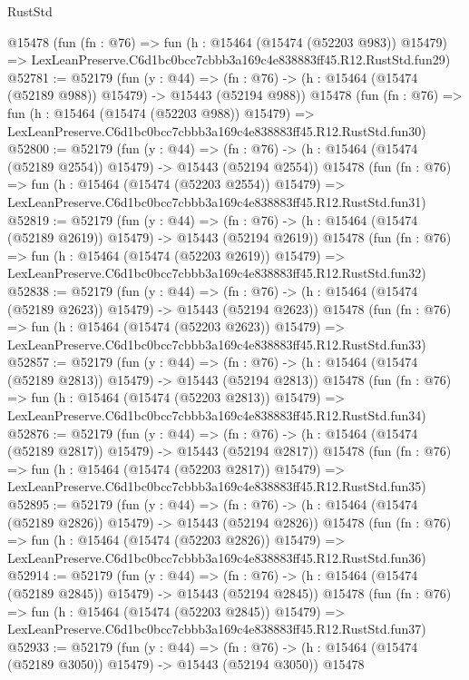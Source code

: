 \begin{lexlean}{RustStd}
\begin{coremodule}
    @15478
    (fun (fn : @76) =>
    fun (h : @15464 (@15474 (@52203 @983)) @15479) =>
    LexLeanPreserve.C6d1bc0bcc7cbbb3a169c4e838883ff45.R12.RustStd.fun29)
@52781 := @52179
    (fun (y : @44) =>
    (fn : @76) -> (h : @15464 (@15474 (@52189 @988)) @15479) -> @15443 (@52194 @988))
    @15478
    (fun (fn : @76) =>
    fun (h : @15464 (@15474 (@52203 @988)) @15479) =>
    LexLeanPreserve.C6d1bc0bcc7cbbb3a169c4e838883ff45.R12.RustStd.fun30)
@52800 := @52179
    (fun (y : @44) =>
    (fn : @76) -> (h : @15464 (@15474 (@52189 @2554)) @15479) -> @15443 (@52194 @2554))
    @15478
    (fun (fn : @76) =>
    fun (h : @15464 (@15474 (@52203 @2554)) @15479) =>
    LexLeanPreserve.C6d1bc0bcc7cbbb3a169c4e838883ff45.R12.RustStd.fun31)
@52819 := @52179
    (fun (y : @44) =>
    (fn : @76) -> (h : @15464 (@15474 (@52189 @2619)) @15479) -> @15443 (@52194 @2619))
    @15478
    (fun (fn : @76) =>
    fun (h : @15464 (@15474 (@52203 @2619)) @15479) =>
    LexLeanPreserve.C6d1bc0bcc7cbbb3a169c4e838883ff45.R12.RustStd.fun32)
@52838 := @52179
    (fun (y : @44) =>
    (fn : @76) -> (h : @15464 (@15474 (@52189 @2623)) @15479) -> @15443 (@52194 @2623))
    @15478
    (fun (fn : @76) =>
    fun (h : @15464 (@15474 (@52203 @2623)) @15479) =>
    LexLeanPreserve.C6d1bc0bcc7cbbb3a169c4e838883ff45.R12.RustStd.fun33)
@52857 := @52179
    (fun (y : @44) =>
    (fn : @76) -> (h : @15464 (@15474 (@52189 @2813)) @15479) -> @15443 (@52194 @2813))
    @15478
    (fun (fn : @76) =>
    fun (h : @15464 (@15474 (@52203 @2813)) @15479) =>
    LexLeanPreserve.C6d1bc0bcc7cbbb3a169c4e838883ff45.R12.RustStd.fun34)
@52876 := @52179
    (fun (y : @44) =>
    (fn : @76) -> (h : @15464 (@15474 (@52189 @2817)) @15479) -> @15443 (@52194 @2817))
    @15478
    (fun (fn : @76) =>
    fun (h : @15464 (@15474 (@52203 @2817)) @15479) =>
    LexLeanPreserve.C6d1bc0bcc7cbbb3a169c4e838883ff45.R12.RustStd.fun35)
@52895 := @52179
    (fun (y : @44) =>
    (fn : @76) -> (h : @15464 (@15474 (@52189 @2826)) @15479) -> @15443 (@52194 @2826))
    @15478
    (fun (fn : @76) =>
    fun (h : @15464 (@15474 (@52203 @2826)) @15479) =>
    LexLeanPreserve.C6d1bc0bcc7cbbb3a169c4e838883ff45.R12.RustStd.fun36)
@52914 := @52179
    (fun (y : @44) =>
    (fn : @76) -> (h : @15464 (@15474 (@52189 @2845)) @15479) -> @15443 (@52194 @2845))
    @15478
    (fun (fn : @76) =>
    fun (h : @15464 (@15474 (@52203 @2845)) @15479) =>
    LexLeanPreserve.C6d1bc0bcc7cbbb3a169c4e838883ff45.R12.RustStd.fun37)
@52933 := @52179
    (fun (y : @44) =>
    (fn : @76) -> (h : @15464 (@15474 (@52189 @3050)) @15479) -> @15443 (@52194 @3050))
    @15478

\end{coremodule}
\end{lexlean}
